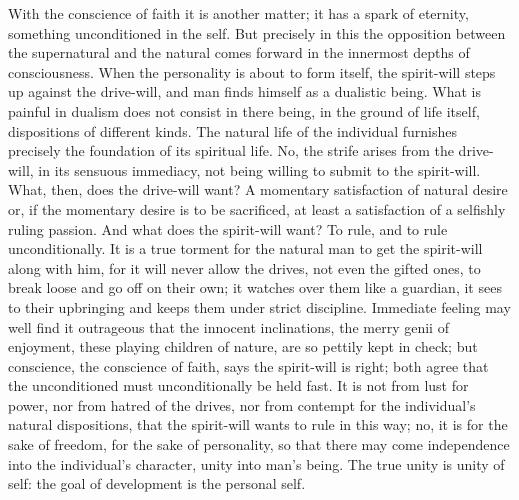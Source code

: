 \documentclass[12pt,a4paper,openany]{book}
\newcommand{\opage}[1]{\marginnote{\footnotesize\textit{[#1]}}}
\begin{document}
\setcounter{footnote}{0}%
\opage{110}With the conscience of faith it is another matter;
it has a spark of eternity, something unconditioned in the self. But
precisely in this the opposition between the supernatural
and the natural comes forward in the innermost depths of consciousness.
When the personality is about to form itself, the spirit-will steps
up against the drive-will, and man finds himself
as a dualistic being. What is painful in
dualism does not consist in there being, in the ground of life
itself, dispositions of different kinds. The natural life of the individual furnishes
precisely the foundation of its spiritual life. No, the strife
arises from the drive-will, in its sensuous immediacy,
not being willing to submit to the spirit-will. What, then,
does the drive-will want? A momentary satisfaction of
natural desire or, if the momentary desire
is to be sacrificed, at least a satisfaction of a selfishly ruling
passion. And what does the spirit-will want? To rule,
and to rule unconditionally. It is a true torment for the
natural man to get the spirit-will along with him, for it
will never allow the drives, not even the gifted ones, to
break loose and go off on their own; it watches over
them like a guardian, it sees to their upbringing
and keeps them under strict discipline. Immediate
feeling may well find it outrageous
that the innocent inclinations, the merry genii of enjoyment,
these playing children of nature, are so pettily
kept in check; but conscience, the conscience of faith,
says the spirit-will is right; both agree that the unconditioned
must unconditionally be held fast. It is
not from lust for power, nor from hatred of the drives, nor
from contempt for the individual's natural dispositions, that the spirit-will
wants to rule in this way; no, it is for the sake of freedom,
for the sake of personality, so that there may come
\setcounter{footnote}{0}%
\opage{111}independence into the individual's character, unity into man's
being. The true unity is unity of self: the goal of
development is the personal self.
\end{document}
